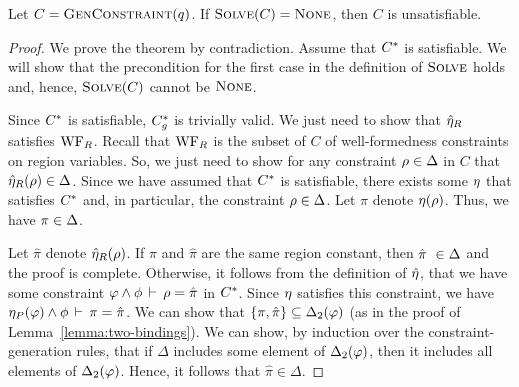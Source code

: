 \begin{theorem}
\label{thm:constraint-solver-completeness}
Let $C = \textsc{GenConstraint}(q)$.
If $\textsc{Solve}(C) = \textsc{None}$, then $C$ is unsatisfiable.
\end{theorem}

\begin{proof}
We prove the theorem by contradiction.
Assume that ${C}^*$ is satisfiable.
We will show that the precondition for the first case in the definition of $\textsc{Solve}$
holds and, hence, $\textsc{Solve}(C)$ cannot be $\textsc{None}$.

Since ${C}^*$ is satisfiable, ${C}^*_g$ is trivially valid.
We just need to show that $\hat{\eta}_R$ satisfies $\text{WF}_R$.
Recall that $\text{WF}_R$ is the subset of $C$ of well-formedness constraints
on region variables.
So, we just need to show for any constraint $\rho \in \Delta$ in $C$ that
$\hat{\eta}_R(\rho) \in \Delta$.
Since we have assumed that ${C}^*$ is satisfiable, there exists some $\eta$ that satisfies ${C}^*$
and, in particular, the constraint $\rho \in \Delta$.
Let $\pi$ denote $\eta(\rho)$. Thus, we have $\pi \in \Delta$.

Let $\hat{\pi}$ denote $\hat{\eta}_R(\rho)$. If $\pi$ and $\hat{\pi}$ are the same region
constant, then $\hat{\pi}\ \in \rhoenv$ and the proof is complete.
%
Otherwise, it follows from the definition of $\hat{\eta}$, that we have some constraint
$\varphi \wedge \phi\,\vdash\,\rho = \hat{\pi}$ in ${C}^*$.
Since $\eta$ satisfies this constraint, we have
$\eta_P(\varphi) \wedge \phi\,\vdash\,\pi = \hat{\pi}$.
We can show that $\{ \pi, \hat{\pi} \} \subseteq {\Delta_2}(\varphi)$
(as in the proof of Lemma~\ref{lemma:two-bindings}).
We can show, by induction over the constraint-generation rules, that if $\Delta$
includes some element of ${\Delta_2}(\varphi)$, then it includes all elements of ${\Delta_2}(\varphi)$.
Hence, it follows that $\hat{\pi} \in \Delta$.



\end{proof}
